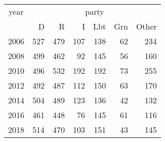 \footnotesize\begin{tabular}[t]{lrrrrrr}
\toprule
\multicolumn{1}{c}{year} & \multicolumn{6}{c}{party} \\
\cmidrule(l{3pt}r{3pt}){1-1} \cmidrule(l{3pt}r{3pt}){2-7}
  & D & R & I & Lbt & Grn & Other\\
\midrule
2006 & 527 & 479 & 107 & 138 & 62 & 234\\
2008 & 499 & 462 & 92 & 145 & 56 & 160\\
2010 & 496 & 532 & 192 & 192 & 73 & 255\\
2012 & 492 & 487 & 112 & 150 & 63 & 170\\
2014 & 504 & 489 & 123 & 136 & 42 & 132\\
2016 & 461 & 448 & 76 & 145 & 61 & 116\\
2018 & 514 & 470 & 103 & 151 & 43 & 145\\
\bottomrule
\end{tabular}
